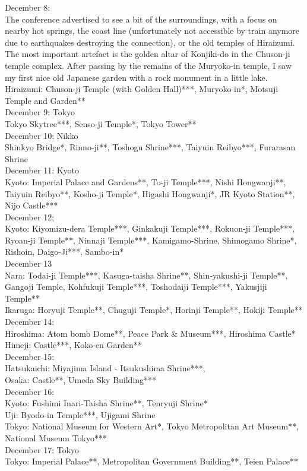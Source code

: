 December 8:\\
The conference advertised to see a bit of the surroundings, with a focus on nearby hot springs, the coast line (unfortunately not accessible by train anymore due to earthquakes destroying the connection), or the old temples of Hiraizumi. The most important artefact is the golden altar of Konjiki-do in the Chuson-ji temple complex. After passing by the remains of the Muryoko-in temple, I saw my first nice old Japanese garden with a rock monument in a little lake.\\

Hiraizumi: Chuson-ji Temple (with Golden Hall)***, Muryoko-in*, Motsuji Temple and Garden**\\

December 9: Tokyo\\
Tokyo Skytree***, Senso-ji Temple*, Tokyo Tower**\\

December 10: Nikko\\
Shinkyo Bridge*, Rinno-ji**, Toshogu Shrine***, Taiyuin Reibyo***, Furarasan Shrine\\

December 11: Kyoto\\
Kyoto: Imperial Palace and Gardens**, To-ji Temple***, Nishi Hongwanji**, Taiyuin Reibyo**, Kosho-ji Temple*, Higashi Hongwanji*, JR Kyoto Station**, Nijo Castle***\\

December 12;\\
Kyoto: Kiyomizu-dera  Temple***, Ginkakuji  Temple***, Rokuon-ji  Temple***, Ryoan-ji Temple**, Ninnaji Temple***, Kamigamo-Shrine, Shimogamo Shrine*, Rishoin, Daigo-Ji***, Sambo-in*\\

December 13\\
Nara: Todai-ji Temple***, Kasuga-taisha Shrine**, Shin-yakushi-ji Temple**, Gangoji Temple, Kohfukuji Temple***, Toshodaiji Temple***, Yakusjiji Temple**\\
Ikaruga: Horyuji Temple**, Chuguji Temple*, Horinji Temple**, Hokiji Temple**\\

December 14:\\
Hiroshima: Atom bomb Dome**, Peace Park \& Museum***, Hiroshima Castle*\\
Himeji: Castle***, Koko-en Garden**\\

December 15:\\
Hatsukaichi: Miyajima Island - Itsukushima Shrine***,\\
Osaka: Castle**, Umeda Sky Building***\\

December 16:\\
Kyoto: Fushimi Inari-Taisha Shrine**, Tenryuji Shrine*\\
Uji: Byodo-in Temple***, Ujigami Shrine\\
Tokyo: National Museum for Western Art*, Tokyo Metropolitan Art Museum**, National Museum Tokyo***\\

December 17: Tokyo\\
Tokyo: Imperial Palace**, Metropolitan Government Building**, Teien Palace**